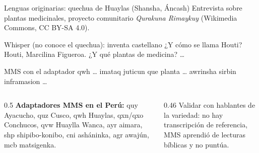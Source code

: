 \documentclass[aspectratio=169,11pt]{beamer}
\newcommand{\cod}[1]{{\small\ttfamily #1}}
\begin{document}
\begin{frame}{Lenguas originarias: quechua de Huaylas (Shansha, Áncash)}
  \small
  Entrevista sobre plantas medicinales, proyecto comunitario \emph{Qurakuna Rimaykuy} (Wikimedia Commons, CC BY-SA 4.0).
  \vspace{4pt}
  \begin{block}{Whisper (no conoce el quechua): inventa castellano}
    \ttfamily\footnotesize ¿Y cómo se llama Houti? Houti, Marcilina Figueroa. ¿Y qué plantas de medicina? \ldots
  \end{block}
  \begin{block}{MMS con el adaptador \cod{qwh}}
    \ttfamily\footnotesize \ldots{} imataq juticun que planta \ldots{} awrinsha sirbin inframasion \ldots
  \end{block}
  \vspace{2pt}
  \begin{columns}[T]
    \begin{column}{0.5\textwidth}
      \footnotesize \textbf{Adaptadores MMS en el Perú:} \cod{quy} Ayacucho, \cod{quz} Cusco, \cod{qwh} Huaylas,
      \cod{qxn}/\cod{qxo} Conchucos, \cod{qvw} Huaylla Wanca, \cod{ayr} aimara, \cod{shp} shipibo-konibo,
      \cod{cni} asháninka, \cod{agr} awajún, \cod{mcb} matsigenka.
    \end{column}
    \begin{column}{0.46\textwidth}
      \footnotesize \alert{Validar con hablantes de la variedad}: no hay transcripción de referencia, MMS aprendió de lecturas
      bíblicas y no puntúa.
    \end{column}
  \end{columns}
\end{frame}
\end{document}
